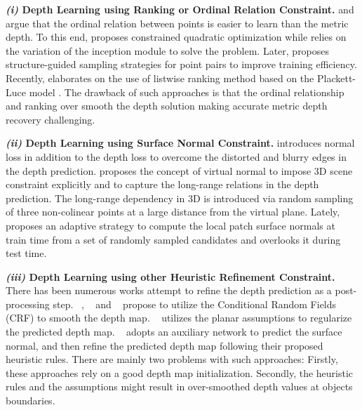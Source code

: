\documentclass{article} \usepackage{iclr2023_conference, times}
\newcommand{\formattedparagraph}[1]{\noindent \textbf{#1}}
\begin{document}
\formattedparagraph{\textit{(i)} Depth Learning using Ranking or Ordinal Relation Constraint.} \citet{zoran2015learning} and \citet{chen2016single} argue that the ordinal relation between points is easier to learn than the metric depth. To this end, \citet{zoran2015learning} proposes constrained quadratic optimization while \citet{chen2016single} relies on the variation of the inception module to solve the problem. Later, \citet{xian2020structure} proposes structure-guided sampling strategies for point pairs to improve training efficiency. Recently, \citet{lienen2021plackett} elaborates on the use of listwise ranking method based on the Plackett-Luce model \citep{luce2012individual}.  The drawback of such approaches is that the ordinal relationship and ranking over smooth the depth solution making accurate metric depth recovery challenging.

\formattedparagraph{\textit{(ii)} Depth Learning using Surface Normal Constraint.}
\citet{hu2019revisiting} introduces normal loss in addition to the depth loss to overcome the distorted and blurry edges in the depth prediction. \citet{yin2019enforcing} proposes the concept of virtual normal to impose 3D scene constraint explicitly and to capture the long-range relations in the depth prediction. The long-range dependency in 3D is introduced via random sampling of three non-colinear points at a large distance from the virtual plane. Lately, \cite{long2021adaptive} proposes an adaptive strategy to compute the local patch surface normals at train time from a set of randomly sampled candidates and overlooks it during test time.

\formattedparagraph{\textit{(iii)} Depth Learning using other Heuristic Refinement Constraint.} There has been numerous works attempt to refine the depth prediction as a post-processing step. ~\citet{liu2015learning}, ~\citet{li2015cvpr} and ~\citet{yuan2022new} propose to utilize the Conditional Random Fields (CRF) to smooth the depth map. ~\citet{lee2019big} utilizes the planar assumptions to regularize the predicted depth map. ~\cite{qi2018geonet} adopts an auxiliary network to predict the surface normal, and then refine the predicted depth map following their proposed heuristic rules. There are mainly two problems with such approaches: Firstly, these approaches rely on a good depth map initialization. Secondly, the heuristic rules and the assumptions might result in over-smoothed depth values at objects boundaries.
\end{document}
